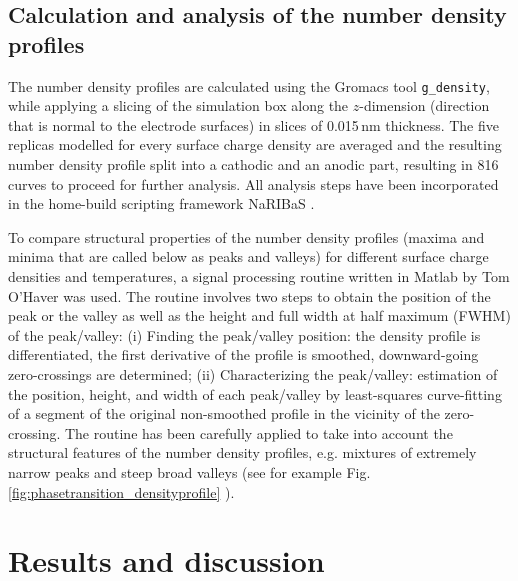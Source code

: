 \documentclass[final,5p,times,twocolumn]{elsarticle}
\begin{document}
\subsection{Calculation and analysis of the number density profiles}

The number density profiles are calculated using the Gromacs tool \verb|g_density|, while applying a slicing of the simulation box along the $z$-dimension (direction that is normal to the electrode surfaces) in slices of 0.015\,nm thickness. The five replicas modelled for every surface charge density are averaged and the resulting number density profile split into a cathodic and an anodic part, resulting in 816 curves to proceed for further analysis. All analysis steps have been incorporated in the home-build scripting framework NaRIBaS \cite{Naribas2013url}.

To compare structural properties of the number density profiles (maxima and minima that are called below as peaks and valleys) for different surface charge densities and temperatures, a signal processing routine written in Matlab by Tom O'Haver \cite{OHaver2012url} was used. The routine involves two steps to obtain the position of the peak or the valley as well as the height and full width at half maximum (FWHM) of the peak/valley: (i) Finding the peak/valley position: the density profile is differentiated, the first derivative of the profile is smoothed, downward-going zero-crossings are determined; (ii) Characterizing the peak/valley: estimation of the position, height, and width of each peak/valley by least-squares curve-fitting of a segment of the original non-smoothed profile in the vicinity of the zero-crossing. The routine has been carefully applied to take into account the structural features of the number density profiles, e.g. mixtures of extremely narrow peaks and steep broad valleys (see for example Fig. \ref{fig:phasetransition_densityprofile} ). 

\section{Results and discussion}
\end{document}
